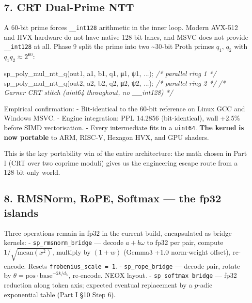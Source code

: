 \documentclass[
  11pt,
]{article}
\newenvironment{Shaded}{}{}
\newcommand{\CommentTok}[1]{\textcolor[rgb]{0.38,0.63,0.69}{\textit{#1}}}
\newcommand{\DecValTok}[1]{\textcolor[rgb]{0.25,0.63,0.44}{#1}}
\newcommand{\NormalTok}[1]{#1}
\begin{document}
\hypertarget{crt-dual-prime-ntt}{%
\subsection{7. CRT Dual-Prime NTT}\label{crt-dual-prime-ntt}}

A 60-bit prime forces \texttt{\_\_int128} arithmetic in the inner loop.
Modern AVX-512 and HVX hardware do not have native 128-bit lanes, and
MSVC does not provide \texttt{\_\_int128} at all. Phase 9 split the
prime into two \textasciitilde30-bit Proth primes \(q_1\), \(q_2\) with
\(q_1 q_2 \approx 2^{60}\):

\begin{Shaded}
\begin{Highlighting}[]
\NormalTok{sp\_poly\_mul\_ntt\_q(out1, a1, b1, q1, μ1, ψ}\DecValTok{1}\NormalTok{, ...);   }\CommentTok{/* parallel ring 1 */}
\NormalTok{sp\_poly\_mul\_ntt\_q(out2, a2, b2, q2, μ2, ψ}\DecValTok{2}\NormalTok{, ...);   }\CommentTok{/* parallel ring 2 */}
\CommentTok{/* Garner CRT stitch (uint64 throughout, no \_\_int128) */}
\end{Highlighting}
\end{Shaded}

Empirical confirmation: - Bit-identical to the 60-bit reference on Linux
GCC and Windows MSVC. - Engine integration: PPL 14.2856 (bit-identical),
wall +2.5\% before SIMD vectorisation. - Every intermediate fits in a
\texttt{uint64}. \textbf{The kernel is now portable} to ARM, RISC-V,
Hexagon HVX, and GPU shaders.

This is the key portability win of the entire architecture: the math
chosen in Part I (CRT over two coprime moduli) gives us the engineering
escape route from a 128-bit-only world.

\hypertarget{rmsnorm-rope-softmax-the-fp32-islands}{%
\subsection{8. RMSNorm, RoPE, Softmax --- the fp32
islands}\label{rmsnorm-rope-softmax-the-fp32-islands}}

Three operations remain in fp32 in the current build, encapsulated as
bridge kernels: - \texttt{sp\_rmsnorm\_bridge} --- decode
\(a + b\omega\) to fp32 per pair, compute
\(1/\sqrt{\mathrm{mean}(x^2)}\), multiply by \((1 + w)\) (Gemma3 +1.0
norm-weight offset), re-encode. Resets \texttt{frobenius\_scale\ =\ 1}.
- \texttt{sp\_rope\_bridge} --- decode pair, rotate by
\(\theta = \mathrm{pos}\cdot\mathrm{base}^{-2k/d_h}\), re-encode. NEOX
layout. - \texttt{sp\_softmax\_bridge} --- fp32 reduction along token
axis; expected eventual replacement by a \(p\)-adic exponential table
(Part I §10 Step 6).
\end{document}
